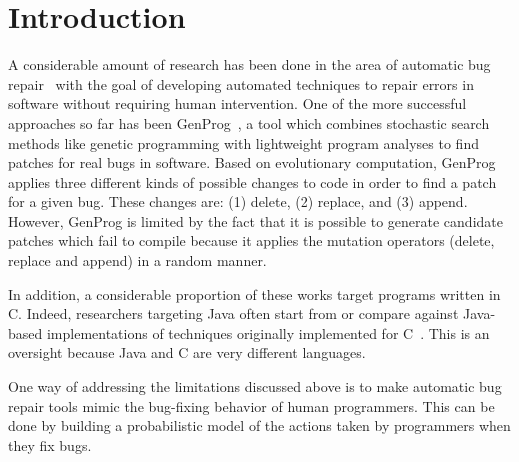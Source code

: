 
\section{Introduction}

A considerable amount of research has been done in the area of automatic bug repair~\cite{kim2013, legoues2012, Mechtaev15, Long2016, weimer2009, kai} with the goal of developing automated techniques to repair errors in software without requiring human intervention. One of the more successful approaches so far has been GenProg~\cite{weimer2009, legoues2012}, a tool which combines stochastic search methods like genetic programming with lightweight program analyses to find patches for real bugs in software. Based on evolutionary computation, GenProg applies three different kinds of possible changes to code in order to find a patch for a given bug. These changes are: (1) delete, (2) replace, and (3) append. However, GenProg is limited by the fact that it is possible to generate candidate patches which fail to compile because it applies the mutation operators (delete, replace and append) in a random manner.

In addition, a considerable proportion of these works target programs written in C. Indeed, researchers targeting Java often start from or compare against Java-based implementations of techniques originally implemented for C~\cite{DeMarco2014, kim2013}. This is an oversight because Java and C are very different languages.

One way of addressing the limitations discussed above is to make automatic bug repair tools mimic the bug-fixing behavior of human programmers. This can be done by building a probabilistic model of the actions taken by programmers when they fix bugs.


